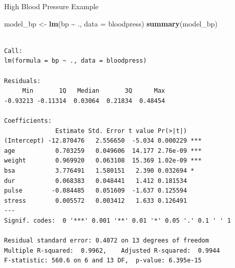 \documentclass[
  ignorenonframetext,
]{beamer}
\newenvironment{Shaded}{\begin{snugshade}}{\end{snugshade}}
\newcommand{\AttributeTok}[1]{\textcolor[rgb]{0.13,0.29,0.53}{#1}}
\newcommand{\FunctionTok}[1]{\textcolor[rgb]{0.13,0.29,0.53}{\textbf{#1}}}
\newcommand{\NormalTok}[1]{#1}
\newcommand{\OtherTok}[1]{\textcolor[rgb]{0.56,0.35,0.01}{#1}}
\newcommand{\SpecialCharTok}[1]{\textcolor[rgb]{0.81,0.36,0.00}{\textbf{#1}}}
\begin{document}
\begin{frame}[fragile]{High Blood Pressure Example}
\label{high-blood-pressure-example-2}
\scriptsize

\begin{Shaded}
\begin{Highlighting}[]
\NormalTok{model\_bp }\OtherTok{\textless{}{-}} \FunctionTok{lm}\NormalTok{(bp }\SpecialCharTok{\textasciitilde{}}\NormalTok{ ., }\AttributeTok{data =}\NormalTok{ bloodpress)}
\FunctionTok{summary}\NormalTok{(model\_bp)}
\end{Highlighting}
\end{Shaded}

\begin{verbatim}

Call:
lm(formula = bp ~ ., data = bloodpress)

Residuals:
     Min       1Q   Median       3Q      Max 
-0.93213 -0.11314  0.03064  0.21834  0.48454 

Coefficients:
              Estimate Std. Error t value Pr(>|t|)    
(Intercept) -12.870476   2.556650  -5.034 0.000229 ***
age           0.703259   0.049606  14.177 2.76e-09 ***
weight        0.969920   0.063108  15.369 1.02e-09 ***
bsa           3.776491   1.580151   2.390 0.032694 *  
dur           0.068383   0.048441   1.412 0.181534    
pulse        -0.084485   0.051609  -1.637 0.125594    
stress        0.005572   0.003412   1.633 0.126491    
---
Signif. codes:  0 '***' 0.001 '**' 0.01 '*' 0.05 '.' 0.1 ' ' 1

Residual standard error: 0.4072 on 13 degrees of freedom
Multiple R-squared:  0.9962,    Adjusted R-squared:  0.9944 
F-statistic: 560.6 on 6 and 13 DF,  p-value: 6.395e-15
\end{verbatim}

\normalsize
\end{frame}
\end{document}
